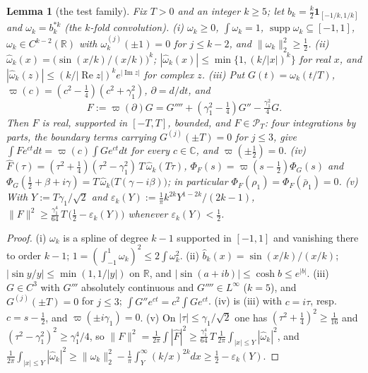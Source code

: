 \documentclass[11pt]{amsart}
\newtheorem{lemma}[theorem]{Lemma}
\theoremstyle{definition}
\theoremstyle{remark}
\newcommand{\C}{\mathbb C}
\newcommand{\R}{\mathbb R}
\newcommand{\Rel}{\operatorname{Re}}
\newcommand{\Iml}{\operatorname{Im}}
\newcommand{\supp}{\operatorname{supp}}
\newcommand{\PT}{\mathcal P_T}
\newcommand{\Fh}{\widehat F}
\begin{document}
\begin{lemma}[the test family]\label{lem:testfam}
Fix $T>0$ and an integer $k\ge5$; let $b_k=\frac k2\mathbf 1_{[-1/k,1/k]}$ and $\omega_k=b_k^{*k}$ (the
$k$-fold convolution).
\emph{(i)} $\omega_k\ge0$, $\int\omega_k=1$, $\supp\omega_k\subseteq[-1,1]$, $\omega_k\in C^{k-2}(\R)$ with
$\omega_k^{(j)}(\pm1)=0$ for $j\le k-2$, and $\|\omega_k\|_2^2\ge\frac12$.
\emph{(ii)} $\widehat\omega_k(x)=\big(\sin(x/k)/(x/k)\big)^k$; $|\widehat\omega_k(x)|\le\min\{1,(k/|x|)^k\}$ for real
$x$, and $|\widehat\omega_k(z)|\le(k/|\Rel z|)^ke^{|\Iml z|}$ for complex $z$.
\emph{(iii)} Put $G(t)=\omega_k(t/T)$, $\varpi(c)=(c^2-\frac14)(c^2+\gamma_1^2)$, $\partial=d/dt$, and
\[
F:=\varpi(\partial)G=G''''+(\gamma_1^2-\tfrac14)G''-\tfrac{\gamma_1^2}4G .
\]
Then $F$ is real, supported in $[-T,T]$, bounded, and $F\in\PT$: four integrations by parts, the
boundary terms carrying $G^{(j)}(\pm T)=0$ for $j\le3$, give $\int Fe^{ct}dt=\varpi(c)\int Ge^{ct}dt$
for every $c\in\C$, and $\varpi(\pm\frac12)=0$.
\emph{(iv)} $\Fh(\tau)=(\tau^2+\frac14)(\tau^2-\gamma_1^2)\,T\,\widehat\omega_k(T\tau)$,
$\Phi_F(s)=\varpi(s-\frac12)\Phi_G(s)$ and $\Phi_G(\frac12+\beta+i\gamma)=T\,\widehat\omega_k\big(T(\gamma-i\beta)\big)$;
in particular $\Phi_F(\rho_1)=\Phi_F(\bar\rho_1)=0$.
\emph{(v)} With $Y:=T\gamma_1/\sqrt2$ and $\varepsilon_k(Y):=\frac1\pi k^{2k}Y^{1-2k}/(2k-1)$,
$\|F\|^2\ge\frac{\gamma_1^4}{64}\,T\,\big(\frac12-\varepsilon_k(Y)\big)$ whenever $\varepsilon_k(Y)<\frac12$.
\end{lemma}
\begin{proof}
(i) $\omega_k$ is a spline of degree $k-1$ supported in $[-1,1]$ and vanishing there to order $k-1$;
$1=(\int_{-1}^1\omega_k)^2\le2\int\omega_k^2$. (ii) $\widehat b_k(x)=\sin(x/k)/(x/k)$; $|\sin y/y|\le\min(1,1/|y|)$
on $\R$, and $|\sin(a+ib)|\le\cosh b\le e^{|b|}$. (iii) $G\in C^3$ with $G'''$ absolutely continuous
and $G''''\in L^\infty$ ($k=5$), and $G^{(j)}(\pm T)=0$ for $j\le3$; $\int G''e^{ct}=c^2\int Ge^{ct}$.
(iv) is (iii) with $c=i\tau$, resp.\ $c=s-\frac12$, and $\varpi(\pm i\gamma_1)=0$. (v) On
$|\tau|\le\gamma_1/\sqrt2$ one has $(\tau^2+\frac14)^2\ge\frac1{16}$ and $(\tau^2-\gamma_1^2)^2\ge\gamma_1^4/4$,
so $\|F\|^2=\frac1{2\pi}\int|\Fh|^2\ge\frac{\gamma_1^4}{64}\,T\,\frac1{2\pi}\int_{|x|\le Y}|\widehat\omega_k|^2$, and
$\frac1{2\pi}\int_{|x|\le Y}|\widehat\omega_k|^2\ge\|\omega_k\|_2^2-\frac1\pi\int_Y^\infty(k/x)^{2k}dx\ge\frac12-\varepsilon_k(Y)$.
\end{proof}
\end{document}

